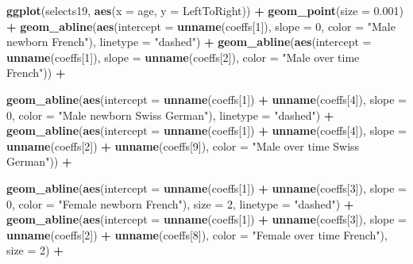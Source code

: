 \documentclass[
]{book}
\newenvironment{Shaded}{\begin{snugshade}}{\end{snugshade}}
\newcommand{\AttributeTok}[1]{\textcolor[rgb]{0.13,0.29,0.53}{#1}}
\newcommand{\DecValTok}[1]{\textcolor[rgb]{0.00,0.00,0.81}{#1}}
\newcommand{\FloatTok}[1]{\textcolor[rgb]{0.00,0.00,0.81}{#1}}
\newcommand{\FunctionTok}[1]{\textcolor[rgb]{0.13,0.29,0.53}{\textbf{#1}}}
\newcommand{\NormalTok}[1]{#1}
\newcommand{\SpecialCharTok}[1]{\textcolor[rgb]{0.81,0.36,0.00}{\textbf{#1}}}
\newcommand{\StringTok}[1]{\textcolor[rgb]{0.31,0.60,0.02}{#1}}
\begin{document}
\begin{Shaded}
\begin{Highlighting}[]
\FunctionTok{ggplot}\NormalTok{(selects19, }\FunctionTok{aes}\NormalTok{(}\AttributeTok{x =}\NormalTok{ age, }\AttributeTok{y =}\NormalTok{ LeftToRight)) }\SpecialCharTok{+}
  \FunctionTok{geom\_point}\NormalTok{(}\AttributeTok{size =} \FloatTok{0.001}\NormalTok{) }\SpecialCharTok{+}
  \FunctionTok{geom\_abline}\NormalTok{(}\FunctionTok{aes}\NormalTok{(}\AttributeTok{intercept =} \FunctionTok{unname}\NormalTok{(coeffs[}\DecValTok{1}\NormalTok{]), }\AttributeTok{slope =} \DecValTok{0}\NormalTok{, }\AttributeTok{color =} \StringTok{"Male newborn French"}\NormalTok{), }\AttributeTok{linetype =} \StringTok{"dashed"}\NormalTok{) }\SpecialCharTok{+}
  \FunctionTok{geom\_abline}\NormalTok{(}\FunctionTok{aes}\NormalTok{(}\AttributeTok{intercept =} \FunctionTok{unname}\NormalTok{(coeffs[}\DecValTok{1}\NormalTok{]), }\AttributeTok{slope =} \FunctionTok{unname}\NormalTok{(coeffs[}\DecValTok{2}\NormalTok{]), }\AttributeTok{color =} \StringTok{"Male over time French"}\NormalTok{)) }\SpecialCharTok{+}

  \FunctionTok{geom\_abline}\NormalTok{(}\FunctionTok{aes}\NormalTok{(}\AttributeTok{intercept =} \FunctionTok{unname}\NormalTok{(coeffs[}\DecValTok{1}\NormalTok{]) }\SpecialCharTok{+} \FunctionTok{unname}\NormalTok{(coeffs[}\DecValTok{4}\NormalTok{]), }\AttributeTok{slope =} \DecValTok{0}\NormalTok{, }\AttributeTok{color =} \StringTok{"Male newborn Swiss German"}\NormalTok{), }\AttributeTok{linetype =} \StringTok{"dashed"}\NormalTok{) }\SpecialCharTok{+}
  \FunctionTok{geom\_abline}\NormalTok{(}\FunctionTok{aes}\NormalTok{(}\AttributeTok{intercept =} \FunctionTok{unname}\NormalTok{(coeffs[}\DecValTok{1}\NormalTok{]) }\SpecialCharTok{+} \FunctionTok{unname}\NormalTok{(coeffs[}\DecValTok{4}\NormalTok{]), }\AttributeTok{slope =} \FunctionTok{unname}\NormalTok{(coeffs[}\DecValTok{2}\NormalTok{]) }\SpecialCharTok{+} \FunctionTok{unname}\NormalTok{(coeffs[}\DecValTok{9}\NormalTok{]), }\AttributeTok{color =} \StringTok{"Male over time Swiss German"}\NormalTok{)) }\SpecialCharTok{+}

  \FunctionTok{geom\_abline}\NormalTok{(}\FunctionTok{aes}\NormalTok{(}\AttributeTok{intercept =} \FunctionTok{unname}\NormalTok{(coeffs[}\DecValTok{1}\NormalTok{]) }\SpecialCharTok{+} \FunctionTok{unname}\NormalTok{(coeffs[}\DecValTok{3}\NormalTok{]), }\AttributeTok{slope =} \DecValTok{0}\NormalTok{, }\AttributeTok{color =} \StringTok{"Female newborn French"}\NormalTok{), }\AttributeTok{size =} \DecValTok{2}\NormalTok{, }\AttributeTok{linetype =} \StringTok{"dashed"}\NormalTok{) }\SpecialCharTok{+}
  \FunctionTok{geom\_abline}\NormalTok{(}\FunctionTok{aes}\NormalTok{(}\AttributeTok{intercept =} \FunctionTok{unname}\NormalTok{(coeffs[}\DecValTok{1}\NormalTok{]) }\SpecialCharTok{+} \FunctionTok{unname}\NormalTok{(coeffs[}\DecValTok{3}\NormalTok{]), }\AttributeTok{slope =} \FunctionTok{unname}\NormalTok{(coeffs[}\DecValTok{2}\NormalTok{]) }\SpecialCharTok{+} \FunctionTok{unname}\NormalTok{(coeffs[}\DecValTok{8}\NormalTok{]), }\AttributeTok{color =} \StringTok{"Female over time French"}\NormalTok{), }\AttributeTok{size =} \DecValTok{2}\NormalTok{) }\SpecialCharTok{+}
  

\end{Highlighting}
\end{Shaded}
\end{document}
